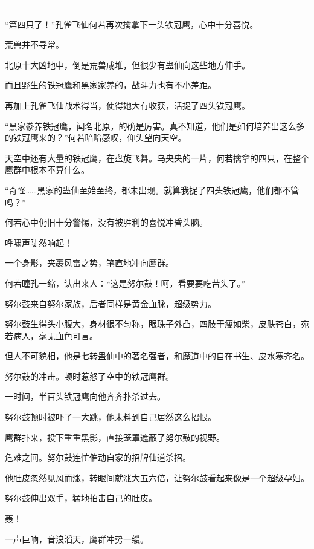 
\begin{this_body}

------------

“第四只了！”孔雀飞仙何若再次擒拿下一头铁冠鹰，心中十分喜悦。

荒兽并不寻常。

北原十大凶地中，倒是荒兽成堆，但很少有蛊仙向这些地方伸手。

而且野生的铁冠鹰和黑家家养的，战斗力也有不小差距。

再加上孔雀飞仙战术得当，使得她大有收获，活捉了四头铁冠鹰。

“黑家豢养铁冠鹰，闻名北原，的确是厉害。真不知道，他们是如何培养出这么多的铁冠鹰来的？”何若暗暗感叹，仰头望向天空。

天空中还有大量的铁冠鹰，在盘旋飞舞。乌央央的一片，何若擒拿的四只，在整个鹰群中根本不算什么。

“奇怪……黑家的蛊仙至始至终，都未出现。就算我捉了四头铁冠鹰，他们都不管吗？”

何若心中仍旧十分警惕，没有被胜利的喜悦冲昏头脑。

呼啸声陡然响起！

一个身影，夹裹风雷之势，笔直地冲向鹰群。

何若瞳孔一缩，认出来人：“这是努尔鼓！呵，看要要吃苦头了。”

努尔鼓来自努尔家族，后者同样是黄金血脉，超级势力。

努尔鼓生得头小腹大，身材很不匀称，眼珠子外凸，四肢干瘦如柴，皮肤苍白，宛若病人，毫无血色可言。

但人不可貌相，他是七转蛊仙中的著名强者，和魔道中的自在书生、皮水寒齐名。

努尔鼓的冲击。顿时惹怒了空中的铁冠鹰群。

一时间，半百头铁冠鹰向他齐齐扑杀过去。

努尔鼓顿时被吓了一大跳，他未料到自己居然这么招恨。

鹰群扑来，投下重重黑影，直接笼罩遮蔽了努尔鼓的视野。

危难之间。努尔鼓连忙催动自家的招牌仙道杀招。

他肚皮忽然见风而涨，转眼间就涨大五六倍，让努尔鼓看起来像是一个超级孕妇。

努尔鼓伸出双手，猛地拍击自己的肚皮。

轰！

一声巨响，音浪滔天，鹰群冲势一缓。


\end{this_body}
